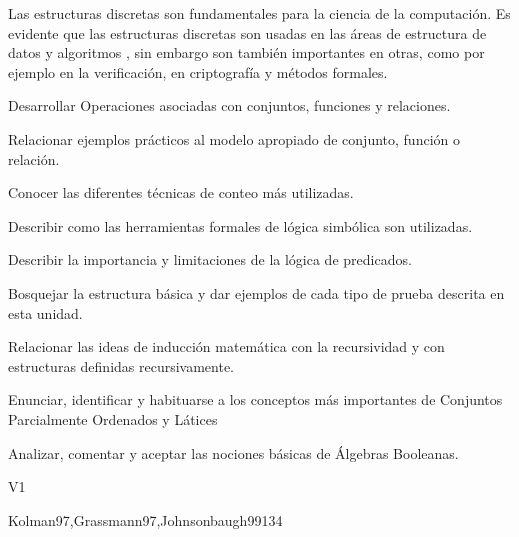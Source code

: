 \begin{syllabus}


\begin{justification}
   Las estructuras discretas son fundamentales para la ciencia de la
   computación. Es evidente que las estructuras discretas son usadas en
   las áreas de estructura de datos y algoritmos , sin embargo son
   también importantes en otras, como por ejemplo en la
   verificación, en criptografía y métodos formales.
   \end{justification}
   
   \begin{goals}
   \item Desarrollar Operaciones asociadas con conjuntos, funciones y relaciones.
   \item Relacionar ejemplos prácticos al modelo apropiado de conjunto, función o relación.
   \item Conocer las diferentes técnicas de conteo más utilizadas.
   \item Describir como las herramientas formales de lógica simbólica son utilizadas.
   \item Describir la importancia y limitaciones de la lógica de predicados.
   \item Bosquejar la estructura básica y dar ejemplos de cada tipo de prueba descrita en esta unidad.
   \item Relacionar las ideas de inducción matemática con la recursividad y con estructuras definidas recursivamente.
   \item Enunciar, identificar y habituarse a los conceptos más importantes de Conjuntos Parcialmente Ordenados y Látices
   \item Analizar, comentar y aceptar las nociones básicas de Álgebras Booleanas.
   \end{goals}
   
   \begin{outcomes}{V1}
      \item {}
      \item {}
      \item {}
   \end{outcomes}
   
   \begin{unit}{\DSSetsRelationsandFunctions}{}{Kolman97,Grassmann97,Johnsonbaugh99}{13}{4}
       \DSSetsRelationsandFunctionsTopicSets
       \DSSetsRelationsandFunctionsAllLearningOutcomes
   \end{unit}
   

\end{syllabus}
